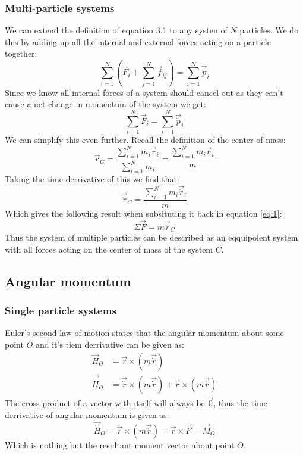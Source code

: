 \documentclass[11pt, a4paper]{article}
\numberwithin{equation}{section}
\numberwithin{figure}{section}
\begin{document}
\subsubsection{Multi-particle systems}
We can extend the definition of equation 3.1 to any systen of $N$ particles. We do this by adding up all the internal and external forces acting on a particle together:
\begin{equation}
  \label{eq:1}
  \sum_{i=1}^N (\vec{F}_i + \sum_{j=1}^N \vec{f}_{ij}) = \sum_{i=1}^N \vec{\dot{p}}_i
\end{equation}
Since we know all internal forces of a system should cancel out as they can't cause a net change in momentum of the system we get:
\begin{equation}
  \sum_{i=1}^N \vec{F}_i = \sum_{i=1}^N \vec{\dot{p}}_i
\end{equation}
We can simplify this even further. Recall the definition of the center of mass:
\begin{equation}
  \vec{r}_C = \frac{\sum_{i=1}^N m_i \vec{r}_i}{\sum_{i=1}^N m_i} = \frac{\sum_{i=1}^N m_i \vec{r}_i}{m}
\end{equation}
Taking the time derrivative of this we find that:
\begin{equation}
  \vec{\ddot{r}}_C = \frac{\sum_{i=1}^N m_i \vec{\ddot{r}}_i}{m}
\end{equation}
Which gives the following result when subsituting it back in equation \ref{eq:1}:
\begin{equation}
  \Sigma \vec{F} = m \vec{\ddot{r}}_C
\end{equation}
Thus the system of multiple particles can be described as an eqquipolent system with all forces acting on the center of mass of the system $C$.


\subsection{Angular momentum}
\subsubsection{Single particle systems}
Euler's second law of motion states that the angular momentum about some point $O$ and it's tiem derrivative can be given as:
\begin{align}
  \vec{H}_O &= \vec{r} \times (m\vec{\dot{r}})\\
  \vec{\dot{H}}_O &= \vec{\dot{r}} \times (m\vec{\dot{r}}) + \vec{r} \times (m\vec{\ddot{r}})
\end{align}
The cross product of a vector with itself will always be $\vec{0}$, thus the time derrivative of angular momentum is given as:
\begin{equation}
  \vec{\dot{H}}_O = \vec{r} \times (m\vec{\ddot{r}}) = \vec{r} \times \vec{F} = \vec{M}_O
\end{equation}
Which is nothing but the resultant moment vector about point $O$.
\end{document}
